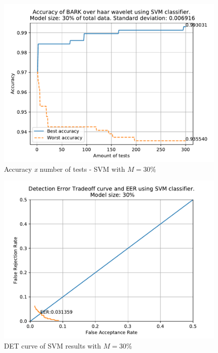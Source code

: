 	\begin{figure}[H]
		\centering
		\includegraphics[scale=.8]{images/results/confusionMatrices/classifier_SVM_30.pdf}
		\caption{Accuracy \textit{x} number of tests - SVM with $M=30\%$}
		\label{fig:classifiersvm30}
	\end{figure}
	\begin{figure}[H]
		\centering
		\includegraphics[scale=.8]{images/results/det/DET_for_classifier_SVM_30.pdf}
		\caption{DET curve of SVM results with $M=30\%$}
		\label{fig:detsvm30}
	\end{figure}
